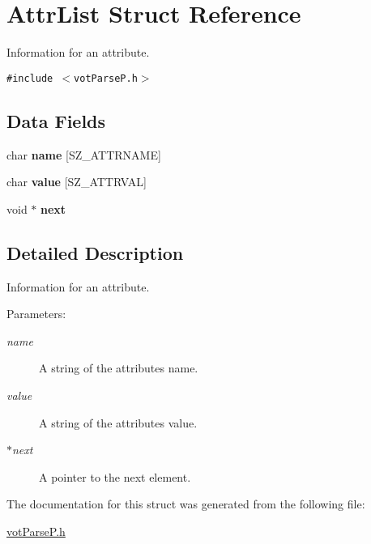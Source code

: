 \hypertarget{structAttrList}{
\section{AttrList Struct Reference}
\label{structAttrList}
}
Information for an attribute.  


{\tt \#include $<$votParseP.h$>$}

\subsection*{Data Fields}
\begin{CompactItemize}
\item 
\hypertarget{structAttrList_217caa5e66c48a418c5e9d8d9b24db50}{
char \textbf{name} \mbox{[}SZ\_\-ATTRNAME\mbox{]}}
\label{structAttrList_217caa5e66c48a418c5e9d8d9b24db50}

\item 
\hypertarget{structAttrList_b05ba979e02ca5a2670e574b3571d0d6}{
char \textbf{value} \mbox{[}SZ\_\-ATTRVAL\mbox{]}}
\label{structAttrList_b05ba979e02ca5a2670e574b3571d0d6}

\item 
\hypertarget{structAttrList_2fbe1489ab80694a08f160a359faaf8f}{
void $\ast$ \textbf{next}}
\label{structAttrList_2fbe1489ab80694a08f160a359faaf8f}

\end{CompactItemize}


\subsection{Detailed Description}
Information for an attribute. 

\begin{Desc}
\item[Parameters:]
\begin{description}
\item[{\em name}]A string of the attributes name. \item[{\em value}]A string of the attributes value. \item[{\em $\ast$next}]A pointer to the next element. \end{description}
\end{Desc}


The documentation for this struct was generated from the following file:\begin{CompactItemize}
\item 
\hyperlink{votParseP_8h}{votParseP.h}\end{CompactItemize}
